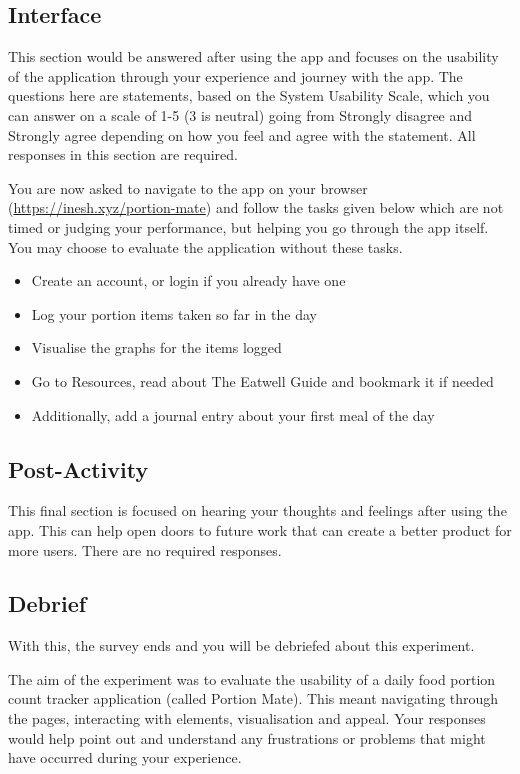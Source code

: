 \documentclass[../main.tex]{subfiles}
\begin{document}
\subsection{Interface}

This section would be answered after using the app and focuses on the usability of the application through your experience and journey with the app. The questions here are statements, based on the System Usability Scale, which you can answer on a scale of 1-5 (3 is neutral) going from Strongly disagree and Strongly agree depending on how you feel and agree with the statement. All responses in this section are required.

You are now asked to navigate to the app on your browser (\href{https://inesh.xyz/portion-mate}{https://inesh.xyz/portion-mate}) and follow the tasks given below which are not timed or judging your performance, but helping you go through the app itself. You may choose to evaluate the application without these tasks.

\begin{itemize}
    \item Create an account, or login if you already have one
    \item Log your portion items taken so far in the day
    \item Visualise the graphs for the items logged
    \item Go to Resources, read about The Eatwell Guide and bookmark it if needed
    \item Additionally, add a journal entry about your first meal of the day
\end{itemize}

\subsection{Post-Activity}

This final section is focused on hearing your thoughts and feelings after using the app. This can help open doors to future work that can create a better product for more users. There are no required responses.

\subsection{Debrief}

With this, the survey ends and you will be debriefed about this experiment.

The aim of the experiment was to evaluate the usability of a daily food portion count tracker application (called Portion Mate). This meant navigating through the pages, interacting with elements, visualisation and appeal. Your responses would help point out and understand any frustrations or problems that might have occurred during your experience.
\end{document}
